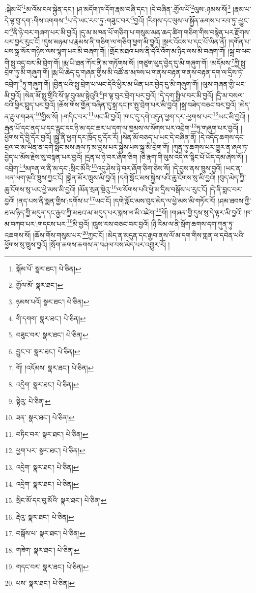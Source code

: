 :སྐེམ་པོ་\footnote{སྐོམ་པོ་  སྣར་ཐང་།  པེ་ཅིན། }མ་འོས་ངལ་སྐྱེན་དང་། །ཤ་མདོག་ཁ་དོག་རྣམ་བཞི་དང་། །དེ་བཞིན་:གྱོལ་པོ་\footnote{གྱོལ་མོ་  སྣར་ཐང་། }ལུས་:ཉམས་སོ།\footnote{ཉམས་པའོ།  སྣར་ཐང་།  པེ་ཅིན། } །རྣམ་པ་དེ་ལྟ་བུ་དག་:གིས་འགགས་\footnote{གི་དགག་  སྣར་ཐང་།  པེ་ཅིན། }པ་དེ་ཡང་རབ་ཏུ་:གཟུང་བར་\footnote{བཟུང་བར་  སྣར་ཐང་།  པེ་ཅིན། }བྱའོ། །རིགས་དང་ལུས་ལ་སྐྱོན་ཆགས་པ་རབ་ཏུ་:ཕྱུང་བ་\footnote{བྱུང་བ་  སྣར་ཐང་།  པེ་ཅིན། }ནི་ཉེ་བར་གཞག་པར་མི་བྱའོ། །དུ་མ་མཁན་པོ་གཅིག་པ་གསུམ་མན་ཆད་ཚིག་གཅིག་གིས་བསྙེན་པར་རྫོགས་པར་བྱར་རུང་ངོ། །དུས་མཉམ་པ་རྣམས་ནི་གཅིག་ལ་གཅིག་ཕྱག་མི་བྱའོ། །སྔར་འོངས་པ་དང་པོ་ཡིན་ནོ། །དགོན་པ་པས་སྐྲ་སོར་གཉིས་ལས་ལྷག་པར་མི་བཞག་གོ། །གྲོང་མཐའ་པས་ནི་དེའི་འོག་མ་ཉིད་ལས་མི་བཞག་གོ། །སྐྲ་བ་ལང་གི་སྤུ་འདྲ་བར་མི་བྲེག་གོ། །རྨ་ཡི་ཐན་ཀོར་ནི་མ་གཏོགས་སོ། །གཙུག་ཕུད་བྱེད་དུ་མི་གཞུག་གོ། །མདོམས་\footnote{གོ། །འདོམས་  སྣར་ཐང་།  པེ་ཅིན། }ཀྱི་སྤུ་བྲེག་ཏུ་མི་གཞུག་གོ། །རྨ་ཡི་ཆེད་དུ་གཞན་གྱིས་མི་འཚོ་ན་མཁས་པ་གནས་བརྟན་གནས་བརྟན་དག་ལ་དྲིས་ཏེ་འབྲེག་\footnote{འདྲེག་  སྣར་ཐང་།  པེ་ཅིན། }ཏུ་གཞུག་གོ། །བྱིན་པའི་སྤུ་བྲེག་པ་ཡང་དེའི་ཕྱིར་མ་ཡིན་པར་བྱེད་དུ་མི་གཞུག་གོ། །ལུས་གཞན་གྱི་ཡང་མི་བྱའོ། །སེན་མོ་སྤུ་གྲིའི་སོ་ལྟ་བུའམ་སྟེའུའི་\footnote{སྟེའུ་  པེ་ཅིན། }ཁ་ལྟ་བུར་བྲེག་པར་བྱའོ། །དེ་དག་སྤྱིལ་བར་མི་བྱའོ། །དྲི་མ་བསལ་བའི་ཕྱིར་བྲུད་པར་བྱའོ། །ཆོས་གོས་གྱོན་བཞིན་དུ་སྐྲ་དང་ཁ་སྤུ་བྲེག་པར་མི་བྱའོ། །སྐྲ་བཟེད་བཅང་བར་བྱའོ། །མེད་ན་རྔུལ་གཟན་\footnote{ཟན་  སྣར་ཐང་།  པེ་ཅིན། }གྱིས་སོ། །:གདིང་བར་\footnote{བཏིང་བར་  སྣར་ཐང་།  པེ་ཅིན། }ཡང་མི་བྱའོ། །གང་དུ་དགེ་འདུན་ཕྱག་དར་:ཕྱགས་པར་\footnote{ཕྱག་པར་  སྣར་ཐང་།  པེ་ཅིན། }ཡང་མི་བྱའོ། །རྒན་པོ་དང་ནད་པ་དང་རླུང་དང་ཉི་མ་དང་ཆར་པ་དག་ལ་ཁྱམས་ལ་སོགས་པར་འབྲེག་\footnote{འདྲེག་  སྣར་ཐང་།  པེ་ཅིན། }ཏུ་གཞུག་པར་བྱའོ། །ཕྱོགས་དེ་བྱི་དོར་བྱའོ། །སྐྲ་ནི་ཕྱག་དར་ཁྲོད་དུ་དོར་རོ། །སེན་མོ་བཅད་པ་ཡང་དེ་བཞིན་ནོ། །དེ་འདོད་ཆགས་དང་བྲལ་བ་མ་ཡིན་ན་དགེ་སློང་མས་ཞལ་ཏ་མ་བྱས་པར་སྐྱེས་པས་སྐྲ་མི་བྲེག་གོ། །ཀུན་ཏུ་ཆགས་པར་གྱུར་ན་ཞལ་ཏ་བྱེད་པ་མོས་རྗེས་སུ་བསྟན་པར་བྱའོ། །དྲན་པ་ཉེ་བར་ཞོག་ཅིག །ཅི་རྣག་གི་ལུས་འདི་ལ་སྙིང་པོ་ཡོད་དམ་ཞེས་སོ། །འབྲེག་\footnote{འདྲེག་  སྣར་ཐང་།  པེ་ཅིན། }མཁན་ལ་ནི་མ་དང་:སྲིང་མོའི་\footnote{སྲིང་མོ་དང་བུ་མོའི་  སྣར་ཐང་།  པེ་ཅིན། }འདུ་ཤེས་ཉེ་བར་ཞོག་ཅིག་ཅེས་སོ། །དེ་བྱས་ནས་ཁྲུས་བྱའོ། །ཡང་ན་ཡན་ལག་ལྔའི་ཁྲུས་ཀྱང་ངོ། །སྒྲེན་མོར་ཁྲུས་མི་བྱའོ། །དགེ་སློང་མས་སྐྱེས་པའི་ཆུ་ངོགས་སུ་མི་བྱའོ། །བུད་མེད་ཀྱི་ཆུ་ངོགས་སུ་ཡང་ཕྱེ་མས་མི་བྱའོ། །མོན་སྲན་སྡེའུ་\footnote{རྡེའུ་  སྣར་ཐང་།  པེ་ཅིན། }ལ་སོགས་པའི་ཕྱེ་མ་དྲིས་བསྒོས་པ་རུང་ངོ། །དེ་ནི་བླང་བར་བྱའོ། །ནད་པས་ནི་སྨན་གྱིས་:དགོས་པ་\footnote{བསྒོས་པ་  སྣར་ཐང་།  པེ་ཅིན། }ཡང་ངོ། །དགེ་སློང་མས་བུད་མེད་ལ་ཕྱེ་མས་མི་གཏོར་རོ། །ཤམ་ཐབས་ཀྱི་ཐ་མ་ཉིད་ཀྱི་མདུན་དང་རྒྱབ་ཀྱི་མཐའ་མ་མདུད་པར་སྐས་ལ་མི་འཛེག་\footnote{གཟེག་  སྣར་ཐང་།  པེ་ཅིན། }གོ། །གཞན་གྱི་དུས་སུ་དེ་ལྟར་མི་བྱའོ། །ཁ་མ་བཀབ་པར་:གདངས་པར་\footnote{གདང་བར་  སྣར་ཐང་།  པེ་ཅིན། }མི་བྱའོ། །ཁྲུས་རས་བཅང་བར་བྱའོ། །ཉི་རིམ་ལ་ནི་སྲོག་ཆགས་དག་ཀུན་ཏུ་འཆགས་སོ། །ཆོས་གོས་གསུམ་པར་\footnote{པས་  སྣར་ཐང་།  པེ་ཅིན། }ཀྱང་ངོ། །མེད་ན་མདུན་དང་རྒྱབ་ནས་ལོ་མ་དག་གིས་གླན་ལ་དབེན་པའི་ཕྱོགས་སུ་ཁྲུས་བྱའོ། །སྲོག་ཆགས་ཆགས་ན་བཤལ་བས་མེད་པར་འགྱུར་རོ། །
